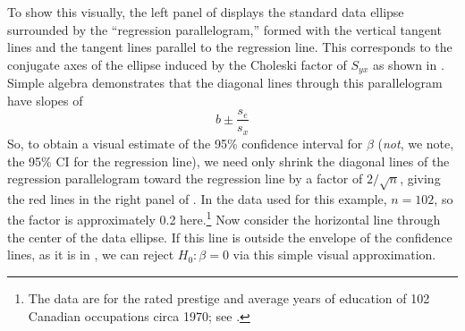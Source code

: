 To show this visually, the left panel of  displays the standard data ellipse
surrounded by the ``regression parallelogram,'' formed with the vertical tangent lines and the
tangent lines parallel to the regression line. This corresponds to the conjugate axes of the
ellipse induced by the Choleski factor of $S_{yx}$ as shown in .
Simple algebra demonstrates that the diagonal lines through
this parallelogram have slopes of
\begin{equation*}
 b \pm \frac{s_{e}}{s_x}
\end{equation*}
So, to obtain a visual estimate of the 95\% confidence interval for $\beta$ (\emph{not}, we note, the 95\% CI for the regression line), we need only shrink the diagonal lines of the
regression parallelogram toward the regression line by a factor of $2/\sqrt{n}$, giving the red lines
in the right panel of .
In the data used for this
example, $n=102$, so the factor  is approximately 0.2 here.\footnote{The data are for the rated prestige and average years of education of 102 Canadian occupations circa 1970; see \citet{FoxSuschnigg:89}.}
Now consider the horizontal line through the center of the data ellipse.  If this line is outside the
envelope of the confidence lines, as it is in , we can reject $H_0 : \beta = 0$ via this simple visual approximation.
